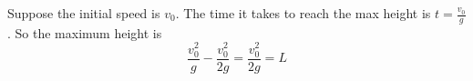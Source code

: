 \documentclass[11pt]{scrartcl}
\begin{document}
\begin{soln}
  Suppose the initial speed is $v_0$. The time it takes to reach the
  max height is $t=\frac{v_0}{g}$. So the maximum height is
  $$\frac{v_0^2}{g}-\frac{v_0^2}{2g}=\frac{v_0^2}{2g}=L$$

\end{soln}
\begin{example}
  [3.50]
\end{example}
\begin{soln}
\end{soln}
\begin{example}
  [3.52]
\end{example}
\begin{soln}
\end{soln}
\end{document}
